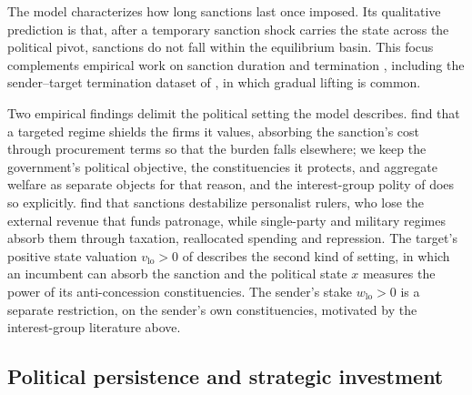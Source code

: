 The model characterizes how long sanctions last once imposed. Its qualitative prediction is
that, after a temporary sanction shock carries the state across the political pivot, sanctions do
not fall within the equilibrium basin. This focus complements empirical
work on sanction duration and termination
\citep{BolksAlSowayel2000,AttiaGrauvogelVonSoest2020}, including the
sender--target termination dataset of \citet{AttiaGrauvogel2023}, in which
gradual lifting is common.

Two empirical findings delimit the political setting the model describes.
\citet{AhnLudema2020} find that a targeted regime shields the firms it
values, absorbing the sanction's cost through procurement terms so that the
burden falls elsewhere; we keep the government's political objective, the
constituencies it protects, and aggregate welfare as separate objects for
that reason, and the interest-group polity of 
does so explicitly. \citet{EscribaFolchWright2010} find that sanctions
destabilize personalist rulers, who lose the external revenue that funds
patronage, while single-party and military regimes absorb them through
taxation, reallocated spending and repression. The target's positive state
valuation $v_{\mathrm{lo}}>0$ of  describes the second kind of
setting, in which an incumbent can absorb the sanction and the political
state $x$ measures the power of its anti-concession constituencies.
The sender's stake $w_{\mathrm{lo}}>0$ is a separate restriction, on the sender's own
constituencies, motivated by the interest-group literature above.

\subsection{Political persistence and strategic investment}
\label{sec:mechanism:comparison}

